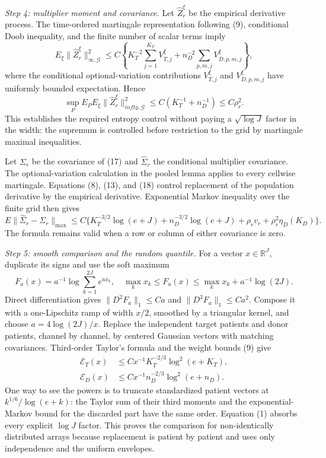 \emph{Step 4: multiplier moment and covariance.}
Let \(\widehat Z_r^\xi\) be the empirical derivative process.  The
time-ordered martingale representation following (9), conditional Doob
inequality, and the finite number of scalar terms imply
\[
 E_\xi\|\widehat Z_r^\xi\|_{\infty,\mathcal G}^2
 \le C\left\{
 K_T^{-2}\sum_{j=1}^{K_T}V_{T,j}^{\xi}
 +n_D^{-2}\sum_{p,m,j}V_{D,p,m,j}^{\xi}\right\},          \tag{20}
\]
where the conditional optional-variation contributions
\(V_{T,j}^{\xi}\) and \(V_{D,p,m,j}^{\xi}\) have uniformly bounded
expectation.  Hence
\[
 \sup_PE_PE_\xi\|\widehat Z_r^\xi\|_{infty,\mathcal G}^2
 \le C(K_T^{-1}+n_D^{-1})\le C\rho_r^2.                   \tag{21}
\]
This establishes the required entropy control without paying a
\(\sqrt{\log J}\) factor in the width: the supremum is controlled before
restriction to the grid by martingale maximal inequalities.

Let \(\Sigma_r\) be the covariance of (17) and
\(\widehat\Sigma_r\) the conditional multiplier covariance.  The
optional-variation calculation in the pooled lemma applies to every
cellwise martingale.  Equations (8), (13), and (18) control replacement of
the population derivative by the empirical derivative.  Exponential
Markov inequality over the finite grid then gives
\[
 E\|\widehat\Sigma_r-\Sigma_r\|_{\max}
 \le C\{K_T^{-3/2}\log(e+J)+n_D^{-3/2}\log(e+J)
          +\rho_r v_r+\rho_r^2\eta_D(K_D)\}.               \tag{22}
\]
The formula remains valid when a row or column of either covariance is
zero.

\emph{Step 5: smooth comparison and the random quantile.}
For a vector \(x\in\mathbb R^J\), duplicate its signs and use the soft
maximum
\[
 F_a(x)=a^{-1}\log\sum_{k=1}^{2J}e^{ax_k},
 \quad
 \max_kx_k\le F_a(x)\le\max_kx_k+a^{-1}\log(2J).           \tag{23}
\]
Direct differentiation gives \(\|D^2F_a\|_1\le Ca\) and
\(\|D^3F_a\|_1\le Ca^2\).  Compose it with a one-Lipschitz ramp of width
\(x/2\), smoothed by a triangular kernel, and choose
\(a=4\log(2J)/x\).  Replace the independent target patients and donor
patients, channel by channel, by centered Gaussian vectors with matching
covariances.  Third-order Taylor's formula and the weight bounds (9) give
\[
 \begin{split}
 \mathcal E_T(x)&\le
 Cx^{-1}K_T^{-2/3}\log^2(e+K_T),\\
 \mathcal E_D(x)&\le
 Cx^{-1}n_D^{-2/3}\log^2(e+n_D).                           \tag{24}
 \end{split}
\]
One way to see the powers is to truncate standardized patient vectors at
\(k^{1/6}/\log(e+k)\): the Taylor sum of their third moments and the
exponential-Markov bound for the discarded part have the same order.
Equation (1) absorbs every explicit \(\log J\) factor.  This proves the
comparison for non-identically distributed arrays because replacement is
patient by patient and uses only independence and the uniform envelopes.

